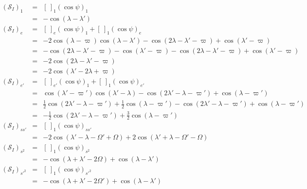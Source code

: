\documentclass [12pt, a4paper] {article}
\begin{document}
\begin {eqnarray}
    (\mathcal{S}_I)_1 
    &=& 
    \left[\:\right]_1
    \left(\cos\psi\right)_1
    \\
    &=& -\cos(\lambda - \lambda')
    \\
    (\mathcal{S}_I)_e
    &=& 
    \left[\:\right]_e
    \left(\cos\psi\right)_1
    +
    \left[\:\right]_1
    \left(\cos\psi\right)_e
    \\
    &=&
    -2\cos(\lambda - \varpi)\cos(\lambda - \lambda')
    -\cos(2\lambda - \lambda' - \varpi)
    +\cos(\lambda' - \varpi)
    \\
    &=&
    -\cos(2\lambda - \lambda' - \varpi) 
    -\cos(\lambda' - \varpi)
    -\cos(2\lambda - \lambda' - \varpi)
    +\cos(\lambda' - \varpi)
    \\
    &=&
    -2\cos(2\lambda - \lambda' - \varpi)
    \\
    &=&
    -2\cos(\lambda' - 2\lambda + \varpi)
    \\
    (\mathcal{S}_I)_{e'}
    &=& 
    \left[\:\right]_{e'}
    \left(\cos\psi\right)_1
    +
    \left[\:\right]_1
    \left(\cos\psi\right)_{e'}
    \\
    &=&
    \cos(\lambda' - \varpi')\cos(\lambda' - \lambda)
    -
    \cos(2\lambda' - \lambda - \varpi')
    +
    \cos(\lambda - \varpi')
    \\
    &=&
    \frac{1}{2}\cos(2\lambda' - \lambda - \varpi')
    +
    \frac{1}{2}\cos(\lambda - \varpi')
    -
    \cos(2\lambda' - \lambda - \varpi')
    +
    \cos(\lambda - \varpi')
    \\
    &=&
    -\frac{1}{2}\cos(2\lambda' - \lambda - \varpi')
    +
    \frac{3}{2}\cos(\lambda - \varpi')
    \\
    (\mathcal{S}_I)_{ss'}
    &=& 
    \left[\:\right]_{1}
    \left(\cos\psi\right)_{ss'}
    \\
    &=&
    -2\cos(\lambda' - \lambda - \Omega' + \Omega)
    + 2\cos(\lambda' + \lambda - \Omega' - \Omega)
    \\
    (\mathcal{S}_I)_{s^2}
    &=& 
    \left[\:\right]_{1}
    \left(\cos\psi\right)_{s^2}
    \\
    &=&
    -\cos(\lambda + \lambda' - 2\Omega)
    + \cos(\lambda - \lambda')
    \\
    (\mathcal{S}_I)_{s'^2}
    &=& 
    \left[\:\right]_{1}
    \left(\cos\psi\right)_{s'^2}
    \\
    &=&
    -\cos(\lambda + \lambda' - 2\Omega')
    + \cos(\lambda - \lambda')
\end {eqnarray}
\end{document}
